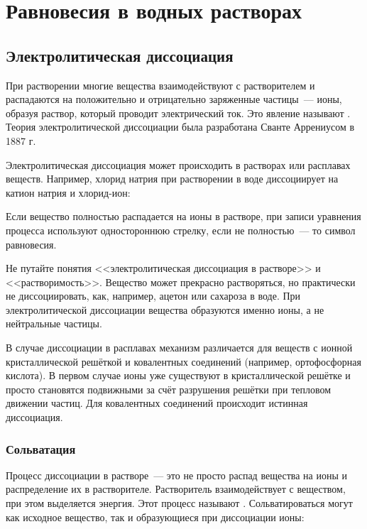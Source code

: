 \chapter{Равновесия в водных растворах}

\section{Электролитическая диссоциация}

При растворении многие вещества взаимодействуют с растворителем и распадаются на положительно и отрицательно заряженные частицы~--- ионы, образуя раствор, который проводит электрический ток. Это явление называют . Теория электролитической диссоциации была разработана Сванте Аррениусом в 1887 г.

Электролитическая диссоциация может происходить в растворах или расплавах веществ. Например, хлорид натрия при растворении в воде диссоциирует на катион натрия и хлорид-ион:


Если вещество полностью распадается на ионы в растворе, при записи уравнения процесса используют одностороннюю стрелку, если не полностью~--- то символ равновесия.

Не путайте понятия <<электролитическая диссоциация в растворе>> и <<растворимость>>. Вещество может прекрасно растворяться, но практически не диссоциировать, как, например, ацетон или сахароза в воде. При электролитической диссоциации вещества образуются именно ионы, а не нейтральные частицы.

В случае диссоциации в расплавах механизм различается для веществ с ионной кристаллической решёткой и ковалентных соединений (например, ортофосфорная кислота). В первом случае ионы уже существуют в кристаллической решётке и просто становятся подвижными за счёт разрушения решётки при тепловом движении частиц. Для ковалентных соединений происходит истинная диссоциация.

\subsection*{Сольватация}

Процесс диссоциации в растворе~--- это не просто распад вещества на ионы и распределение их в растворителе. Растворитель взаимодействует с веществом, при этом выделяется энергия. Этот процесс называют . Сольватироваться могут как исходное вещество, так и образующиеся при диссоциации ионы:


